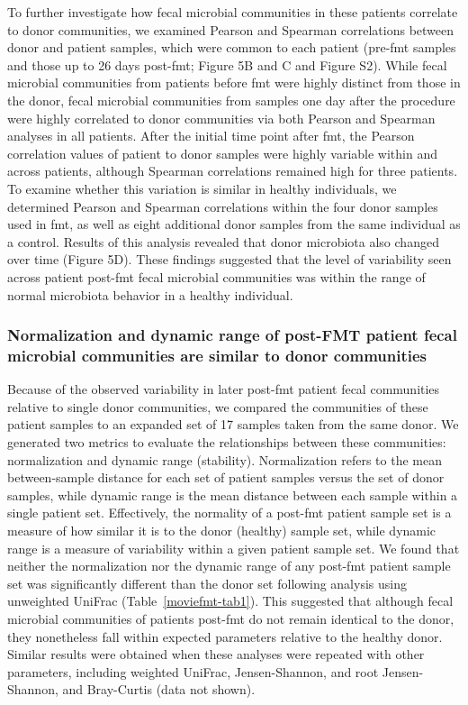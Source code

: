 To further investigate how fecal microbial communities in these patients correlate to donor communities, we examined Pearson and Spearman correlations between donor and patient samples, which were common to each patient (pre-\gls{fmt} samples and those up to 26 days post-\gls{fmt}; Figure 5B and C and Figure S2). While fecal microbial communities from patients before \gls{fmt} were highly distinct from those in the donor, fecal microbial communities from samples one day after the procedure were highly correlated to donor communities via both Pearson and Spearman analyses in all patients. After the initial time point after \gls{fmt}, the Pearson correlation values of patient to donor samples were highly variable within and across patients, although Spearman correlations remained high for three patients. To examine whether this variation is similar in healthy individuals, we determined Pearson and Spearman correlations within the four donor samples used in \gls{fmt}, as well as eight additional donor samples from the same individual as a control. Results of this analysis revealed that donor microbiota also changed over time (Figure 5D). These findings suggested that the level of variability seen across patient post-\gls{fmt} fecal microbial communities was within the range of normal microbiota behavior in a healthy individual.

\subsubsection{Normalization and dynamic range of post-FMT patient fecal microbial communities are similar to donor communities}

Because of the observed variability in later post-\gls{fmt} patient fecal communities relative to single donor communities, we compared the communities of these patient samples to an expanded set of 17 samples taken from the same donor. We generated two metrics to evaluate the relationships between these communities: normalization and dynamic range (stability). Normalization refers to the mean between-sample distance for each set of patient samples versus the set of donor samples, while dynamic range is the mean distance between each sample within a single patient set. Effectively, the normality of a post-\gls{fmt} patient sample set is a measure of how similar it is to the donor (healthy) sample set, while dynamic range is a measure of variability within a given patient sample set. We found that neither the normalization nor the dynamic range of any post-\gls{fmt} patient sample set was significantly different than the donor set following analysis using unweighted UniFrac  (Table~\ref{moviefmt-tab1}). This suggested that although fecal microbial communities of patients post-\gls{fmt} do not remain identical to the donor, they nonetheless fall within expected parameters relative to the healthy donor. Similar results were obtained when these analyses were repeated with other parameters, including weighted UniFrac, Jensen-Shannon,  and root Jensen-Shannon, and Bray-Curtis (data not shown).

